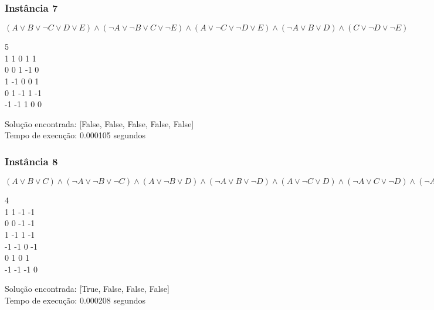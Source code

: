 \documentclass[12pt]{article}
\begin{document}
    \subsubsection{Instância 7}
        \((A \lor B \lor \neg C \lor D \lor E) \land (\neg A \lor \neg B \lor C \lor \neg E) \land (A \lor \neg C \lor \neg D \lor E) \land (\neg A \lor B \lor D) \land (C \lor \neg D \lor \neg E)\)
        \begin{tcolorbox}[title=Entrada da instância 7, width=\linewidth, fontupper=\ttfamily,  halign=flush left]
            5 \\
            1 1 0 1 1 \\
            0 0 1 -1 0 \\
            1 -1 0 0 1 \\
            0 1 -1 1 -1 \\
            -1 -1 1 0 0 \\
        \end{tcolorbox}
        \begin{tcolorbox}[title=Saída da instância 7, width=\linewidth, fontupper=\ttfamily, halign=flush left]
            Solução encontrada: [False, False, False, False, False] \\
            Tempo de execução: 0.000105 segundos
        \end{tcolorbox}
    \subsubsection{Instância 8}
        \((A \lor B \lor C) \land (\neg A \lor \neg B \lor \neg C) \land (A \lor \neg B \lor D) \land (\neg A \lor B \lor \neg D) \land (A \lor \neg C \lor D) \land (\neg A \lor C \lor \neg D) \land (\neg A \lor \neg B \lor C \lor D) \land (A \lor B \lor \neg C \lor \neg D)\)
        \begin{tcolorbox}[title=Entrada da instância 8, width=\linewidth, fontupper=\ttfamily,  halign=flush left]
            4 \\
            1 1 -1 -1 \\
            0 0 -1 -1 \\
            1 -1 1 -1 \\
            -1 -1 0 -1 \\
            0 1 0 1 \\
            -1 -1 -1 0 \\
        \end{tcolorbox}
        \begin{tcolorbox}[title=Saída da instância 8, width=\linewidth, fontupper=\ttfamily, halign=flush left]
            Solução encontrada: [True, False, False, False] \\
            Tempo de execução: 0.000208 segundos
        \end{tcolorbox}
\end{document}
